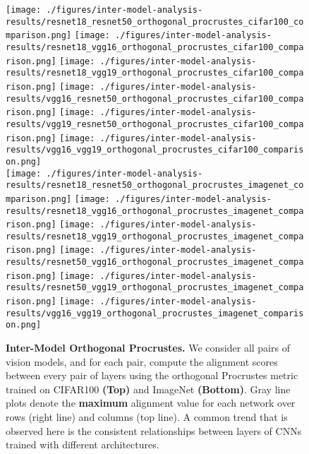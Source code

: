 \begin{figure*}[b!]
    \centering
    \texttt{[image: ./figures/inter-model-analysis-results/resnet18\_resnet50\_orthogonal\_procrustes\_cifar100\_comparison.png]}\hfill
    \texttt{[image: ./figures/inter-model-analysis-results/resnet18\_vgg16\_orthogonal\_procrustes\_cifar100\_comparison.png]}\hfill
    \texttt{[image: ./figures/inter-model-analysis-results/resnet18\_vgg19\_orthogonal\_procrustes\_cifar100\_comparison.png]}\hfill 
    \texttt{[image: ./figures/inter-model-analysis-results/vgg16\_resnet50\_orthogonal\_procrustes\_cifar100\_comparison.png]}\hfill
    \texttt{[image: ./figures/inter-model-analysis-results/vgg19\_resnet50\_orthogonal\_procrustes\_cifar100\_comparison.png]}\hfill 
    \texttt{[image: ./figures/inter-model-analysis-results/vgg16\_vgg19\_orthogonal\_procrustes\_cifar100\_comparison.png]}\\
    
    \texttt{[image: ./figures/inter-model-analysis-results/resnet18\_resnet50\_orthogonal\_procrustes\_imagenet\_comparison.png]}\hfill
    \texttt{[image: ./figures/inter-model-analysis-results/resnet18\_vgg16\_orthogonal\_procrustes\_imagenet\_comparison.png]}\hfill
    \texttt{[image: ./figures/inter-model-analysis-results/resnet18\_vgg19\_orthogonal\_procrustes\_imagenet\_comparison.png]}\hfill 
    \texttt{[image: ./figures/inter-model-analysis-results/resnet50\_vgg16\_orthogonal\_procrustes\_imagenet\_comparison.png]}\hfill
    \texttt{[image: ./figures/inter-model-analysis-results/resnet50\_vgg19\_orthogonal\_procrustes\_imagenet\_comparison.png]}\hfill 
    \texttt{[image: ./figures/inter-model-analysis-results/vgg16\_vgg19\_orthogonal\_procrustes\_imagenet\_comparison.png]}
    
    \caption{\textbf{Inter-Model Orthogonal Procrustes.} We consider all pairs of vision models, and for each pair, compute the alignment scores between every pair of layers using the orthogonal Procrustes metric trained on CIFAR100 \textbf{(Top)} and ImageNet \textbf{(Bottom)}. Gray line plots denote the \textbf{maximum} alignment value for each network over rows (right line) and columns (top line). A common trend that is observed here is the consistent relationships between layers of CNNs trained with different architectures.}
    \label{tab:procrustes_inter_model}
\end{figure*}